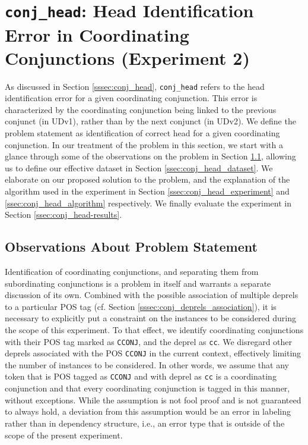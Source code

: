 \chapter{\texttt{conj\_head}: Head Identification Error in Coordinating Conjunctions (Experiment 2)}
\label{chap:conj_head}

As discussed in Section \ref{sssec:conj_head}, \texttt{conj\_head} refers to the head identification error for a given coordinating conjunction. This error is characterized by the coordinating conjunction being linked to the previous conjunct (in UDv1), rather than by the next conjunct (in UDv2). We define the problem statement as identification of correct head for a given coordinating conjunction. In our treatment of the problem in this section, we start with a glance through some of the observations on the problem in Section \ref{ssec:conj_head_observations}, allowing us to define our effective dataset in Section \ref{ssec:conj_head_dataset}. We elaborate on our proposed solution to the problem, and the explanation of the algorithm used in the experiment in Section \ref{ssec:conj_head_experiment} and \ref{ssec:conj_head_algorithm} respectively. We finally evaluate the experiment in Section \ref{ssec:conj_head-results}.

\section{Observations About Problem Statement}
\label{ssec:conj_head_observations}

Identification of coordinating conjunctions, and separating them from subordinating conjunctions is a problem in itself and warrants a separate discussion of its own. Combined with the possible association of multiple deprels to a particular POS tag (cf. Section \ref{sssec:conj_deprels_association}), it is necessary to explicitly put a constraint on the instances to be considered during the scope of this experiment. To that effect, we identify coordinating conjunctions with their POS tag marked as \verb|CCONJ|, and the deprel as \verb|cc|. We disregard other deprels associated with the POS \verb|CCONJ| in the current context, effectively limiting the number of instances to be considered. In other words, we assume that any token that is POS tagged as \verb|CCONJ| and with deprel as \verb|cc| is a coordinating conjunction and that every coordinating conjunction is tagged in this manner, without exceptions. While the assumption is not fool proof and is not guaranteed to always hold, a deviation from this assumption would be an error in labeling rather than in dependency structure, i.e., an error type that is outside of the scope of the present experiment.

